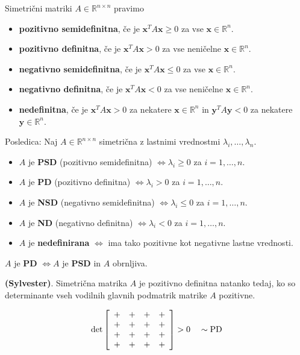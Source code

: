 \documentclass{article}
\begin{document}
\begin{multicols}{2}
Simetrični matriki \( A \in \mathbb{R}^{n \times n} \) pravimo
\begin{itemize}
  \item \textbf{pozitivno semidefinitna}, če je \( \mathbf{x}^T A \mathbf{x} \geq 0 \) za vse \( \mathbf{x} \in \mathbb{R}^n \).
  \item \textbf{pozitivno definitna}, če je \( \mathbf{x}^T A \mathbf{x} > 0 \) za vse neničelne \( \mathbf{x} \in \mathbb{R}^n \).
  \item \textbf{negativno semidefinitna}, če je \( \mathbf{x}^T A \mathbf{x} \leq 0 \) za vse \( \mathbf{x} \in \mathbb{R}^n \).
  \item \textbf{negativno definitna}, če je \( \mathbf{x}^T A \mathbf{x} < 0 \) za vse neničelne \( \mathbf{x} \in \mathbb{R}^n \).
  \item \textbf{nedefinitna}, če je \( \mathbf{x}^T A \mathbf{x} > 0 \) za nekatere \( \mathbf{x} \in \mathbb{R}^n \) in \( \mathbf{y}^T A \mathbf{y} < 0 \) za nekatere \( \mathbf{y} \in \mathbb{R}^n \).
\end{itemize}

Posledica: Naj \( A \in \mathbb{R}^{n \times n} \) simetrična z lastnimi vrednostmi \( \lambda_i, \ldots, \lambda_n \).
\begin{itemize}
  \item \( A \) je \textbf{PSD} (pozitivno semidefinitna) \( \Leftrightarrow \lambda_i \geq 0 \) za \( i=1,\ldots,n \).
  \item \( A \) je \textbf{PD} (pozitivno definitna) \( \Leftrightarrow \lambda_i > 0 \) za \( i=1,\ldots,n \).
  \item \( A \) je \textbf{NSD} (negativno semidefinitna) \( \Leftrightarrow \lambda_i \leq 0 \) za \( i=1,\ldots,n \).
  \item \( A \) je \textbf{ND} (negativno definitna) \( \Leftrightarrow \lambda_i < 0 \) za \( i=1,\ldots,n \).
  \item \( A \) je \textbf{nedefinirana} \( \Leftrightarrow \) ima tako pozitivne kot negativne lastne vrednosti.
\end{itemize}
\( A \) je \textbf{PD} \( \Leftrightarrow A \) je \textbf{PSD} in \( A \) obrnljiva.

\textbf{(Sylvester)}. Simetrična matrika \( A \) je pozitivno definitna natanko tedaj, ko so determinante vseh vodilnih glavnih podmatrik matrike \( A \) pozitivne.

\[
\text{det} \left[
\begin{array}{cccc}
+ & + & + & + \\
+ & + & + & + \\
+ & + & + & + \\
+ & + & + & + \\
\end{array}
\right] > 0 \quad \sim \text{PD} \\
\]


\end{multicols}
\end{document}
